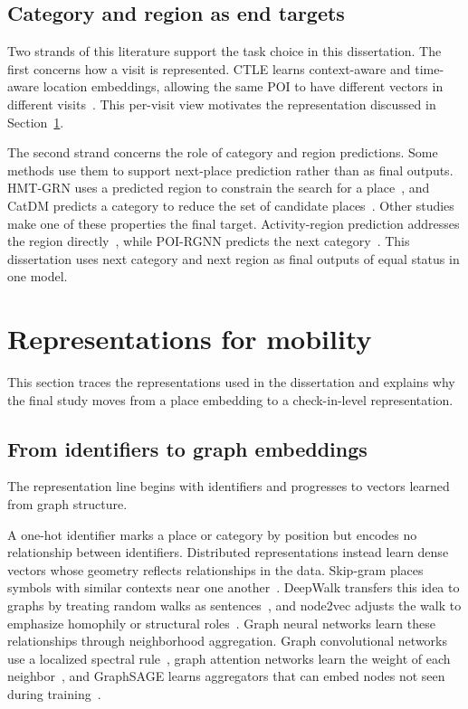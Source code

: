 \subsection{Category and region as end targets}

Two strands of this literature support the task choice in this dissertation. The first
concerns how a visit is represented. CTLE learns context-aware and time-aware location
embeddings, allowing the same POI to have different vectors in different
visits~\cite{lin2021ctle}. This per-visit view motivates the representation discussed in
Section~\ref{sec:fund:repr}.

The second strand concerns the role of category and region predictions. Some methods
use them to support next-place prediction rather than as final outputs. HMT-GRN uses a
predicted region to constrain the search for a place~\cite{Lim2022}, and CatDM predicts
a category to reduce the set of candidate places~\cite{yu2020catdm}. Other studies make
one of these properties the final target. Activity-region prediction addresses the
region directly~\cite{zhu2022drrgnn}, while POI-RGNN predicts the next
category~\cite{capanema2023poirgnn}. This dissertation uses next category and next
region as final outputs of equal status in one model.


\section{Representations for mobility}
\label{sec:fund:repr}

This section traces the representations used in the dissertation and explains why the
final study moves from a place embedding to a check-in-level representation.

\subsection{From identifiers to graph embeddings}

The representation line begins with identifiers and progresses to vectors learned
from graph structure.


A one-hot identifier marks a place or category by position but encodes no relationship
between identifiers. Distributed representations instead learn dense vectors whose
geometry reflects relationships in the data. Skip-gram places symbols with similar
contexts near one another~\cite{mikolov2013word2vec}. DeepWalk transfers this idea to
graphs by treating random walks as sentences~\cite{perozzi2014deepwalk}, and node2vec
adjusts the walk to emphasize homophily or structural
roles~\cite{grover2016node2vec}. Graph neural networks learn these relationships
through neighborhood aggregation. Graph convolutional networks use a localized
spectral rule~\cite{kipf2017gcn}, graph attention networks learn the weight of each
neighbor~\cite{velivckovic2017graph}, and GraphSAGE learns aggregators that can embed
nodes not seen during training~\cite{hamilton2017graphsage}.

